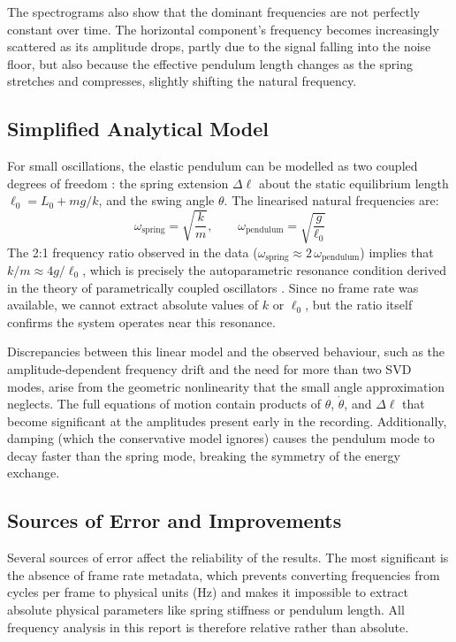 \documentclass[12pt,a4paper]{article}
\begin{document}
The spectrograms also show that the dominant frequencies are not perfectly constant over time. The horizontal component's frequency becomes increasingly scattered as its amplitude drops, partly due to the signal falling into the noise floor, but also because the effective pendulum length changes as the spring stretches and compresses, slightly shifting the natural frequency.

\subsection{Simplified Analytical Model}

For small oscillations, the elastic pendulum can be modelled as two coupled degrees of freedom \citep{lynch2002}: the spring extension $\Delta\ell$ about the static equilibrium length $\ell_0 = L_0 + mg/k$, and the swing angle $\theta$. The linearised natural frequencies are:
{\small
\begin{equation}
    \omega_{\text{spring}} = \sqrt{\frac{k}{m}}, \qquad \omega_{\text{pendulum}} = \sqrt{\frac{g}{\ell_0}}
\end{equation}
}
The 2:1 frequency ratio observed in the data ($\omega_{\text{spring}} \approx 2\,\omega_{\text{pendulum}}$) implies that $k/m \approx 4g/\ell_0$, which is precisely the autoparametric resonance condition derived in the theory of parametrically coupled oscillators \citep{nayfeh1979}. Since no frame rate was available, we cannot extract absolute values of $k$ or $\ell_0$, but the ratio itself confirms the system operates near this resonance.

Discrepancies between this linear model and the observed behaviour, such as the amplitude-dependent frequency drift and the need for more than two SVD modes, arise from the geometric nonlinearity that the small angle approximation neglects. The full equations of motion contain products of $\theta$, $\dot{\theta}$, and $\Delta\ell$ that become significant at the amplitudes present early in the recording. Additionally, damping (which the conservative model ignores) causes the pendulum mode to decay faster than the spring mode, breaking the symmetry of the energy exchange.

\subsection{Sources of Error and Improvements}

Several sources of error affect the reliability of the results. The most significant is the absence of frame rate metadata, which prevents converting frequencies from cycles per frame to physical units (Hz) and makes it impossible to extract absolute physical parameters like spring stiffness or pendulum length. All frequency analysis in this report is therefore relative rather than absolute.
\end{document}
